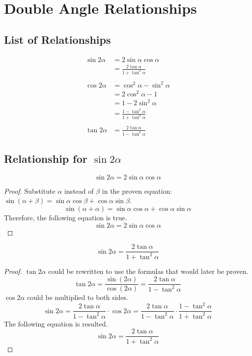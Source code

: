 \documentclass{article}
\begin{document}
\section{Double Angle Relationships}
\subsection{List of Relationships}
\begin{align*}
    \sin2\alpha&=2\sin\alpha\cos\alpha \\
    &=\frac{2\tan\alpha}{1+\tan^2\alpha} \\\\
    \cos2\alpha&=\cos^2\alpha-\sin^2\alpha \\
    &=2\cos^2\alpha-1 \\
    &=1-2\sin^2\alpha \\
    &=\frac{1-\tan^2\alpha}{1+\tan^2\alpha} \\\\
    \tan2\alpha&=\frac{2\tan\alpha}{1-\tan^2\alpha}
\end{align*}

\subsection{Relationship for $\sin2\alpha$}
    \[
    \sin2\alpha=2\sin\alpha\cos\alpha
    \]
\begin{proof}
    Substitute $\alpha$ instead of $\beta$ in the proven equation:
    $\sin(\alpha+\beta)=\sin\alpha\cos\beta+\cos\alpha\sin\beta$.
    \[
    \sin(\alpha+\alpha)=\sin\alpha\cos\alpha+\cos\alpha\sin\alpha
    \]
    Therefore, the following equation is true.
    \[
    \sin2\alpha=2\sin\alpha\cos\alpha
    \]
\end{proof}
    \[
    \sin2\alpha=\frac{2\tan\alpha}{1+\tan^2\alpha}
    \]
\begin{proof}
    $\tan2\alpha$ could be rewritten to use the formulas that would later be proven.
    \[
    \tan2\alpha=\frac{\sin(2\alpha)}{\cos(2\alpha)}=\frac{2\tan\alpha}{1-\tan^2\alpha}
    \]
    $\cos2\alpha$ could be multiplied to both sides.
    \[
    \sin2\alpha=\frac{2\tan\alpha}{1-\tan^2\alpha}\cdot\cos2\alpha=\frac{2\tan\alpha}{1-\tan^2\alpha}\cdot\frac{1-\tan^2\alpha}{1+\tan^2\alpha}
    \]
    The following equation is resulted.
    \[
    \sin2\alpha=\frac{2\tan\alpha}{1+\tan^2\alpha}
    \]
\end{proof}
\end{document}

